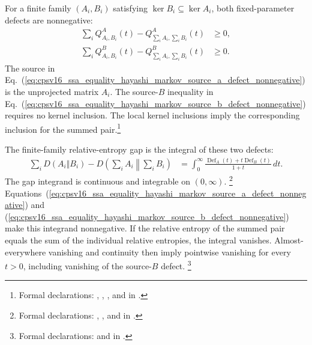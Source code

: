 \documentclass[11pt]{article}
\begin{document}
For a finite family $(A_i,B_i)$ satisfying
$\ker B_i\subseteq\ker A_i$, both fixed-parameter defects are nonnegative:
\begin{align}
    \sum_iQ^A_{A_i,B_i}(t)
        -Q^A_{\sum_iA_i,\sum_iB_i}(t)
        &\geq 0,
    \label{eq:cpsv16_ssa_equality_hayashi_markov_source_a_defect_nonnegative}\\
    \sum_iQ^B_{A_i,B_i}(t)
        -Q^B_{\sum_iA_i,\sum_iB_i}(t)
        &\geq 0.
    \label{eq:cpsv16_ssa_equality_hayashi_markov_source_b_defect_nonnegative}
\end{align}
The source in
Eq.~(\ref{eq:cpsv16_ssa_equality_hayashi_markov_source_a_defect_nonnegative})
is the unprojected matrix $A_i$. The source-$B$ inequality in
Eq.~(\ref{eq:cpsv16_ssa_equality_hayashi_markov_source_b_defect_nonnegative})
requires no kernel inclusion. The local kernel inclusions imply the
corresponding inclusion for the summed pair.\footnote{Formal declarations:
,
,
,
and
 in
.}

The finite-family relative-entropy gap is the integral of these two defects:
\begin{align}
    \sum_iD(A_i\Vert B_i)
        -D\!\left(\sum_iA_i\middle\Vert\sum_iB_i\right)
        &=
        \int_0^\infty
        \frac{\operatorname{Def}_A(t)+t\operatorname{Def}_B(t)}
             {1+t}\,dt.
    \label{eq:cpsv16_ssa_equality_hayashi_markov_support_family_gap}
\end{align}
The gap integrand is continuous and integrable on $(0,\infty)$.%
\footnote{Formal declarations:
,
,
and
 in
.}
Equations~(\ref{eq:cpsv16_ssa_equality_hayashi_markov_source_a_defect_nonnegative})
and
(\ref{eq:cpsv16_ssa_equality_hayashi_markov_source_b_defect_nonnegative}) make
this integrand nonnegative. If the relative entropy of the summed pair equals
the sum of the individual relative entropies, the integral vanishes.
Almost-everywhere vanishing and continuity then imply pointwise vanishing for
every $t>0$, including vanishing of the source-$B$ defect.%
\footnote{Formal declarations:
 and
 in
.}
\end{document}
